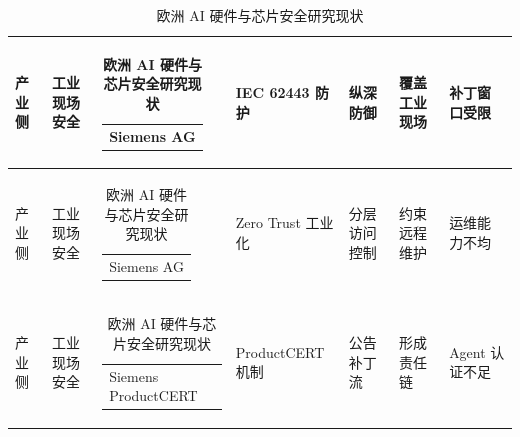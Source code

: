 \begin{table}[htbp]
\begin{tabularx}{\textwidth}{|p{0.85cm}|p{1.45cm}|p{2.25cm}|X|X|X|X|}
\hline
产业侧 & 工业现场安全 & \begin{tabular}[t]{@{}l@{}}Siemens AG\end{tabular} & IEC 62443 防护 \cite{siemensindustrialcyber2026} & 纵深防御 & 覆盖工业现场 & 补丁窗口受限 \\
\hline
产业侧 & 工业现场安全 & \begin{tabular}[t]{@{}l@{}}Siemens AG\end{tabular} & Zero Trust 工业化 \cite{siemensindustrialcyber2026} & 分层访问控制 & 约束远程维护 & 运维能力不均 \\
\hline
产业侧 & 工业现场安全 & \begin{tabular}[t]{@{}l@{}}Siemens ProductCERT\end{tabular} & ProductCERT 机制 \cite{siemensindustrialcyber2026} & 公告补丁流 & 形成责任链 & Agent 认证不足 \\
\hline
\end{tabularx}
\caption{欧洲 AI 硬件与芯片安全研究现状}
\label{tab:europe-ai-hardware-security-compact}
\end{table}

